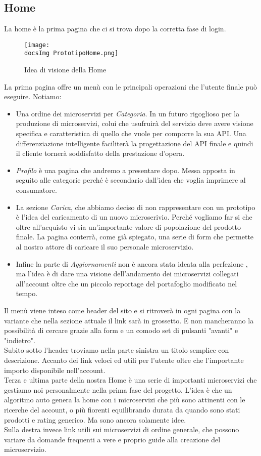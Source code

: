 {	\subsection{Home}{
		La home è la prima pagina che ci si trova dopo la corretta fase di login. \\
		\begin{figure}[ht]
			\centering
			\texttt{[image: \\docsImg PrototipoHome.png]}
			\caption{Idea di visione della Home}
			\label{PrototipoHome}
		\end{figure}
		La prima pagina offre un menù con le principali operazioni che l'utente finale può eseguire. Notiamo:
		\begin{itemize}
			\item Una ordine dei microservizi per \textit{Categoria}. In un futuro rigoglioso per la produzione di microservizi, colui che usufruirà del servizio deve avere visione specifica e caratteristica di quello che vuole per comporre la sua API. Una differenziazione intelligente faciliterà la progettazione del API finale e quindi il cliente tornerà soddisfatto della prestazione d'opera.
			\item \textit{Profilo} è una pagina che andremo a presentare dopo. Messa apposta in seguito alle categorie perché è secondario dall'idea che voglia imprimere al consumatore.
			\item La sezione \textit{Carica}, che abbiamo deciso di non rappresentare con un prototipo è l'idea del caricamento di un nuovo microserivio. Perché vogliamo far si che oltre all'acquisto vi sia un'importante valore di popolazione del prodotto finale. La pagina conterrà, come già spiegato, una serie di form che permette al nostro attore di caricare il suo personale microservizio.
			\item Infine la parte di \textit{Aggiornamenti} non è ancora stata ideata alla perfezione , ma l'idea è di dare una visione dell'andamento dei microservizi collegati all'account oltre che un piccolo reportage del portafoglio modificato nel tempo.
		\end{itemize}
		Il menù viene inteso come header del sito e si ritroverà in ogni pagina con la variante che nella sezione attuale il link sarà in grossetto. E non mancheranno la possibilità di cercare grazie alla form e un comodo set di pulsanti "avanti" e "indietro".\\
		Subito sotto l'header troviamo nella parte sinistra un titolo semplice con descrizione. Accanto dei link veloci ed utili per l'utente oltre che l'importante importo disponibile nell'account.\\
		Terza e ultima parte della nostra Home è una serie di importanti microservizi che gestiamo noi personalmente nella prima fase del progetto. L'idea è che un algoritmo auto genera la home con i microservizi che più sono attinenti con le ricerche del account, o più fiorenti equilibrando durata da quando sono stati prodotti e rating generico. Ma sono ancora solamente idee.\\
		Sulla destra invece link utili sui microservizi di ordine generale, che possono variare da domande frequenti a vere e proprio guide alla creazione del microservizio.
	}
	
}
